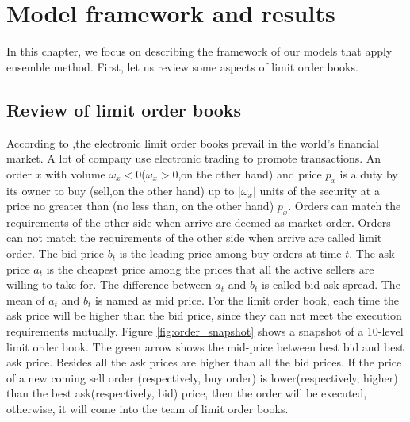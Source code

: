 \chapter{Model framework and results}\label{ch:ensemble} 
In this chapter, we focus on describing the framework of our models that apply ensemble method.  First, let us review some aspects of limit order books. 
\section{Review of limit order books}
According to \cite{rocsu2009dynamic},the electronic limit order books prevail in the world's financial market. A lot of company use electronic trading to promote transactions. An order $x$ with volume $\omega_x<0$($\omega_x>0$,on the other hand) and price $p_x$ is a duty by its owner to buy (sell,on the other hand) up to $|\omega_x|$ units of the security at a price no greater than (no less than, on the other hand) $p_x$. Orders can match the requirements of the other side when arrive are deemed as market order. Orders can not match the requirements of the other side when arrive are called  limit order. The bid price $b_t$ is the leading price among buy orders at time $t$. The ask price $a_t$ is the cheapest price among the prices that all the active sellers are willing to take for. The difference between $a_t$ and $b_t$ is called bid-ask spread. The mean of $a_t$ and $b_t$ is named as mid price. For the limit order book, each time the ask price will be higher than the bid price, since they can not meet the execution requirements mutually. Figure \ref{fig:order_snapshot} shows a snapshot of a 10-level limit order book. The green arrow shows the mid-price between best bid and best ask price. Besides all the ask prices are higher than all the bid prices. If the price of a new coming sell order (respectively, buy order) is lower(respectively, higher) than the best ask(respectively, bid) price, then the order will be executed, otherwise, it will come into the team of limit order books.

